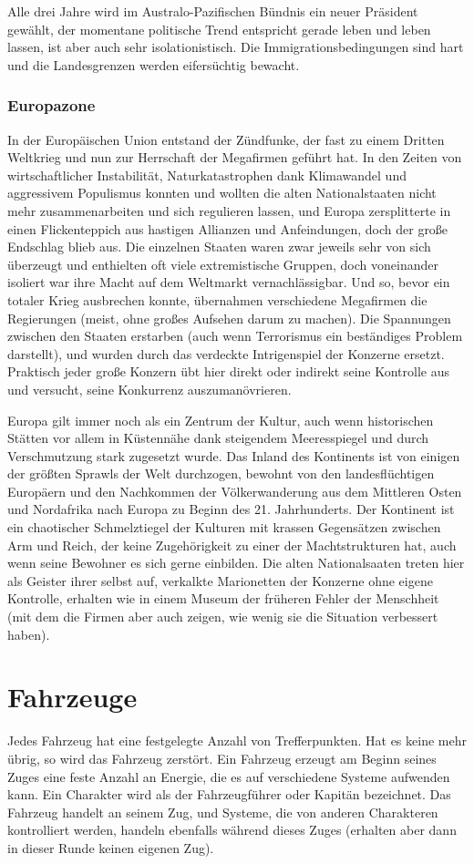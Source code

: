 Alle drei Jahre wird im Australo-Pazifischen Bündnis ein neuer Präsident gewählt, der momentane politische Trend entspricht gerade \glqq leben und leben lassen\grqq{}, ist aber auch sehr isolationistisch. Die Immigrationsbedingungen sind hart und die Landesgrenzen werden eifersüchtig bewacht.
\subsubsection{Europazone}
In der Europäischen Union entstand der Zündfunke, der fast zu einem Dritten Weltkrieg und nun zur Herrschaft der Megafirmen geführt hat. In den Zeiten von wirtschaftlicher Instabilität, Naturkatastrophen dank Klimawandel und aggressivem Populismus konnten und wollten die alten Nationalstaaten nicht mehr zusammenarbeiten und sich regulieren lassen, und Europa zersplitterte in einen Flickenteppich aus hastigen Allianzen und Anfeindungen, doch der große Endschlag blieb aus. Die einzelnen Staaten waren zwar jeweils sehr von sich überzeugt und enthielten oft viele extremistische Gruppen, doch voneinander isoliert war ihre Macht auf dem Weltmarkt vernachlässigbar. Und so, bevor ein totaler Krieg ausbrechen konnte, übernahmen verschiedene Megafirmen die Regierungen (meist, ohne großes Aufsehen darum zu machen). Die Spannungen zwischen den Staaten erstarben (auch wenn Terrorismus ein beständiges Problem darstellt), und wurden durch das verdeckte Intrigenspiel der Konzerne ersetzt. Praktisch jeder große Konzern übt hier direkt oder indirekt seine Kontrolle aus und versucht, seine Konkurrenz auszumanövrieren.

Europa gilt immer noch als ein Zentrum der Kultur, auch wenn historischen Stätten vor allem in Küstennähe dank steigendem Meeresspiegel und durch Verschmutzung stark zugesetzt wurde. Das Inland des Kontinents ist von einigen der größten Sprawls der Welt durchzogen, bewohnt von den landesflüchtigen Europäern und den Nachkommen der Völkerwanderung aus dem Mittleren Osten und Nordafrika nach Europa zu Beginn des 21. Jahrhunderts. Der Kontinent ist ein chaotischer Schmelztiegel der Kulturen mit krassen Gegensätzen zwischen Arm und Reich, der keine Zugehörigkeit zu einer der Machtstrukturen hat, auch wenn seine Bewohner es sich gerne einbilden. Die alten Nationalsaaten treten hier als Geister ihrer selbst auf, verkalkte Marionetten der Konzerne ohne eigene Kontrolle, erhalten wie in einem Museum der früheren Fehler der Menschheit (mit dem die Firmen aber auch zeigen, wie wenig sie die Situation verbessert haben).
\section{Fahrzeuge}
Jedes Fahrzeug hat eine festgelegte Anzahl von Trefferpunkten. Hat es keine mehr übrig, so wird das Fahrzeug zerstört. Ein Fahrzeug erzeugt am Beginn seines Zuges eine feste Anzahl an \glqq Energie\grqq{}, die es auf verschiedene Systeme aufwenden kann. Ein Charakter wird als der \glqq Fahrzeugführer\grqq{}  oder Kapitän bezeichnet. Das Fahrzeug handelt an seinem Zug, und Systeme, die von anderen Charakteren kontrolliert werden, handeln ebenfalls während dieses Zuges (erhalten aber dann in dieser Runde keinen eigenen Zug).

